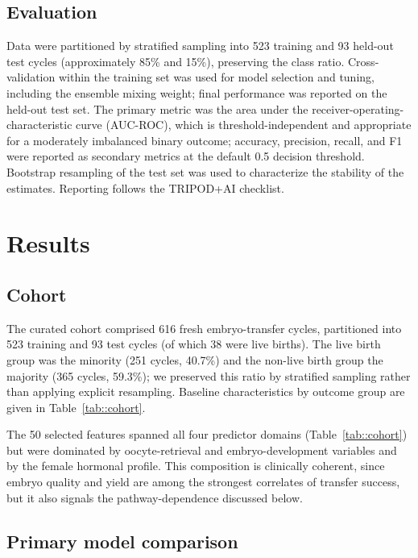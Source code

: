 \documentclass[12pt,a4paper]{article}
\begin{document}
\subsection*{Evaluation}

Data were partitioned by stratified sampling into 523 training and 93 held-out test cycles (approximately 85\% and 15\%), preserving the class ratio. Cross-validation within the training set was used for model selection and tuning, including the ensemble mixing weight; final performance was reported on the held-out test set. The primary metric was the area under the receiver-operating-characteristic curve (AUC-ROC), which is threshold-independent and appropriate for a moderately imbalanced binary outcome; accuracy, precision, recall, and F1 were reported as secondary metrics at the default 0.5 decision threshold. Bootstrap resampling of the test set was used to characterize the stability of the estimates. Reporting follows the TRIPOD+AI checklist.\cite{tripod}

\section*{Results}

\subsection*{Cohort}

The curated cohort comprised 616 fresh embryo-transfer cycles, partitioned into 523 training and 93 test cycles (of which 38 were live births). The live birth group was the minority (251 cycles, 40.7\%) and the non-live birth group the majority (365 cycles, 59.3\%); we preserved this ratio by stratified sampling rather than applying explicit resampling. Baseline characteristics by outcome group are given in Table~\ref{tab::cohort}.

The 50 selected features spanned all four predictor domains (Table~\ref{tab::cohort}) but were dominated by oocyte-retrieval and embryo-development variables and by the female hormonal profile. This composition is clinically coherent, since embryo quality and yield are among the strongest correlates of transfer success, but it also signals the pathway-dependence discussed below.



\subsection*{Primary model comparison}
\end{document}
